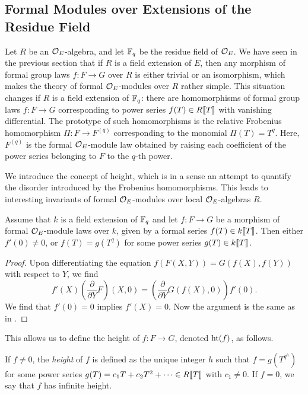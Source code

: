 \documentclass[../main.tex]{subfiles}
\begin{document}

\subsection{Formal Modules over Extensions of the Residue Field} %
\label{sub:Formal DVR-Modules over Fields}
Let $R$ be an $\mathcal{O}_E$-algebra, and let 
$\mathbb{F}_q$ be the residue field of $\mathcal{O}_E$. We have seen in the previous section
that if $R$ is a field extension of $E$,
then any morphism of formal group laws $f\colon  F \to G$ over $R$ is either trivial
or an isomorphism, which makes the theory of formal $\mathcal{O}_E$-modules over $R$ rather
simple. This situation changes if $R$ is a field extension of $\mathbb{F}_q$: there are
homomorphisms of formal group laws $f\colon F \to G$ corresponding to power
series $f(T) \in R \llbracket T \rrbracket$ with vanishing differential. The prototype of
such homomorphisms is the relative Frobenius homomorphism $\Pi \colon F \to
F^{(q)}$ corresponding to the monomial $\Pi(T) = T^q$. Here, $F^{(q)}$ is the
formal $\mathcal{O}_E$-module law obtained by raising each coefficient of the power series
belonging to $F$ to the $q$-th power.

We introduce the concept of height, which is in a sense an attempt to quantify
the disorder introduced by the Frobenius homomorphisms. This leads to
interesting invariants of formal $\mathcal{O}_E$-modules over local $\mathcal{O}_E$-algebras $R$.

\begin{lem}\label{lem:LemmaForDefOfHeight}
  Assume that $k$ is a field extension of $\mathbb{F}_q$ and let $f\colon  F \to G$ be a
  morphism of 
  formal $\mathcal{O}_E$-module laws over $k$, given by a formal series $f(T) \in
  k\llbracket T \rrbracket$. Then either $f'(0) \neq 0$, or 
  $f(T) = g(T^q)$ for some power series $g(T) \in k \llbracket T \rrbracket$.
\begin{proof}
  Upon differentiating the equation $f(F(X,Y)) = G(f(X), f(Y))$ with respect to 
  $Y$, we find
  \begin{equation*}
    f'(X) \left(\frac{\partial}{\partial Y}F\right)(X,0)
    =\left( \frac{\partial}{\partial Y}G(f(X), 0)\right) f'(0).
  \end{equation*}
  We find that $f'(0) = 0$ implies $f'(X) = 0$. 
  Now the argument is the same as in \cite[Lemma 4.1]{hopkins1994equivariant}.
\end{proof}
\end{lem}

This allows us to define the height of $f\colon F \to G$, denoted $\textnormal{ht}(f)$,
as follows.
\begin{defi}
  If $f \neq 0$, the \emph{height} of $f$ is defined as the unique integer $h$ such that 
  $f = g(T^{q^h})$ for some power series $g(T) = c_1 T + c_2 T^2 + \dots \in
  R\llbracket T \rrbracket$ with $c_1 \neq 0$. 
  If $f = 0$, we say that $f$ has infinite height. 
\end{defi}
\end{document}
